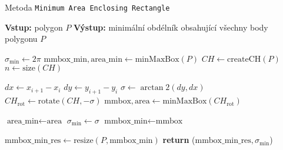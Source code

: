 \begin{algorithm}
    \caption{Metoda \texttt{Minimum Area Enclosing Rectangle}}
    \begin{algorithmic}[1]
        \STATE \textbf{Vstup:} polygon $P$
        \STATE \textbf{Výstup:} minimální obdélník obsahující všechny body polygonu $P$
        
        \STATE $\sigma_{\text{min}} \gets 2\pi$
        \STATE $\text{mmbox\_min}, \text{area\_min} \gets \text{minMaxBox}(P)$
        \STATE $CH \gets \text{createCH}(P)$
        \STATE $n \gets \text{size}(CH)$
        
            \STATE $dx \gets x_{i+1} - x_i$
            \STATE $dy \gets y_{i+1} - y_i$
            \STATE $\sigma \gets \arctan2(dy, dx)$
            \STATE $CH_{\text{rot}} \gets \text{rotate}(CH, -\sigma)$
            \STATE $\text{mmbox}, \text{area} \gets \text{minMaxBox}(CH_{\text{rot}})$
            
                \STATE $\text{area\_min} \gets \text{area}$
                \STATE $\sigma_{\text{min}} \gets \sigma$
                \STATE $\text{mmbox\_min} \gets \text{mmbox}$
            \ENDIF
        \ENDFOR
        
        \STATE $\text{mmbox\_min\_res} \gets \text{resize}(P, \text{mmbox\_min})$
        \STATE \textbf{return} ($\text{mmbox\_min\_res}, \sigma_{\text{min}}$)
    \end{algorithmic}
\end{algorithm}